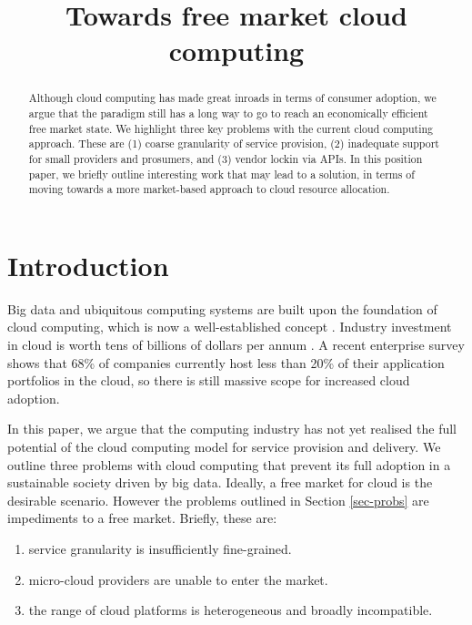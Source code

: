 \documentclass[conference,10pt]{IEEEtran}
\begin{document}
\title{Towards free market cloud computing}


\author{
}

\maketitle


\begin{abstract}
Although cloud computing has made great inroads in terms of consumer adoption, we argue that the paradigm still has a long way to go to reach an economically efficient free market state.
We highlight three key problems with the current cloud computing approach. These are (1) coarse granularity of service provision, (2) inadequate support for small providers and prosumers, and (3) vendor lockin via APIs.
In this position paper, we briefly outline interesting work that may lead to a solution, in terms of moving towards a more market-based approach to cloud resource allocation.
\end{abstract}


\section{Introduction}
\label{sec-intro}

Big data and ubiquitous computing systems are built upon the foundation of cloud computing, which is now a well-established concept \cite{armbrust2010view}. Industry investment in cloud is worth tens of billions of dollars per annum 
\cite{url1,url2}.
A recent enterprise survey \cite{rightscale} shows that 68\% of companies currently host less than 20\% of their application portfolios in the cloud, so there is still massive scope for increased cloud adoption.

In this paper, we argue that the computing industry has not yet realised the full potential of the cloud computing model for service provision and delivery. We outline three problems with cloud computing that prevent its full adoption in a sustainable society driven by big data.
Ideally, a free market for cloud is the desirable scenario. However the problems outlined in Section \ref{sec-probs}
are impediments to a free market. Briefly, these are:
\begin{enumerate}
\item service granularity is insufficiently fine-grained.
\item micro-cloud providers are unable to enter the market.
\item the range of cloud platforms is heterogeneous and broadly incompatible.
\end{enumerate}
\end{document}

